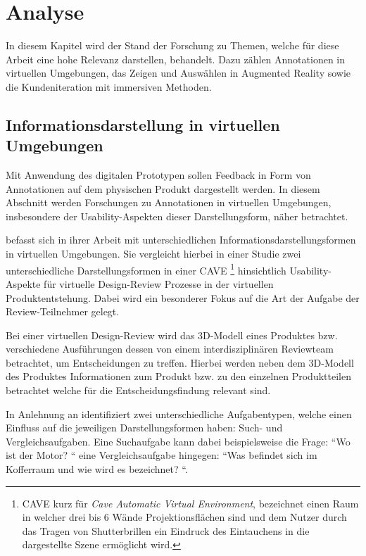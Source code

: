 \chapter{Analyse} \label{anlayse_capter}

In diesem Kapitel wird der Stand der Forschung zu Themen, welche für diese Arbeit eine hohe Relevanz darstellen, behandelt. Dazu zählen Annotationen in virtuellen Umgebungen, das Zeigen und Auswählen in Augmented Reality sowie die Kundeniteration mit immersiven Methoden.

\section{Informationsdarstellung in virtuellen Umgebungen}\label{brand_abschnitt}

Mit Anwendung des digitalen Prototypen sollen Feedback in Form von Annotationen auf dem physischen Produkt dargestellt werden. 
In diesem Abschnitt werden Forschungen zu Annotationen in virtuellen Umgebungen, insbesondere der Usability-Aspekten dieser Darstellungsform, näher betrachtet. 

\citeauthor{Brandenburg2019} befasst sich in ihrer Arbeit mit unterschiedlichen Informationsdarstellungsformen in virtuellen Umgebungen.
Sie vergleicht hierbei in einer Studie zwei unterschiedliche Darstellungsformen in einer CAVE \footnote{CAVE kurz für \textit{Cave Automatic Virtual Environment}, bezeichnet einen Raum in welcher drei bis 6 Wände Projektionsflächen sind und dem Nutzer durch das Tragen von Shutterbrillen ein Eindruck des Eintauchens in die dargestellte Szene ermöglicht wird. } hinsichtlich Usability-Aspekte für virtuelle Design-Review Prozesse in der virtuellen Produktentstehung. Dabei wird ein besonderer Fokus auf die Art der Aufgabe der Review-Teilnehmer gelegt.
\cite[S.~48]{Brandenburg2019}

Bei einer virtuellen Design-Review wird das 3D-Modell eines Produktes bzw. verschiedene Ausführungen dessen von einem interdisziplinären Reviewteam betrachtet, um Entscheidungen zu treffen. 
Hierbei werden neben dem 3D-Modell des Produktes Informationen zum Produkt bzw. zu den einzelnen Produktteilen betrachtet welche für die Entscheidungsfindung relevant sind. \cite[S.~32]{Brandenburg2019}
 
In Anlehnung an \cite{Polys2004} \cite{Polys2007} identifiziert \citeauthor{Brandenburg2019} zwei unterschiedliche Aufgabentypen, welche einen Einfluss auf die jeweiligen Darstellungsformen haben: Such- und Vergleichsaufgaben. 
Eine Suchaufgabe kann dabei beispielsweise die Frage: ``Wo ist der Motor? `` eine Vergleichsaufgabe hingegen: ``Was befindet sich im Kofferraum und wie wird es bezeichnet? ``. \cite[S.~52]{Brandenburg2019}

